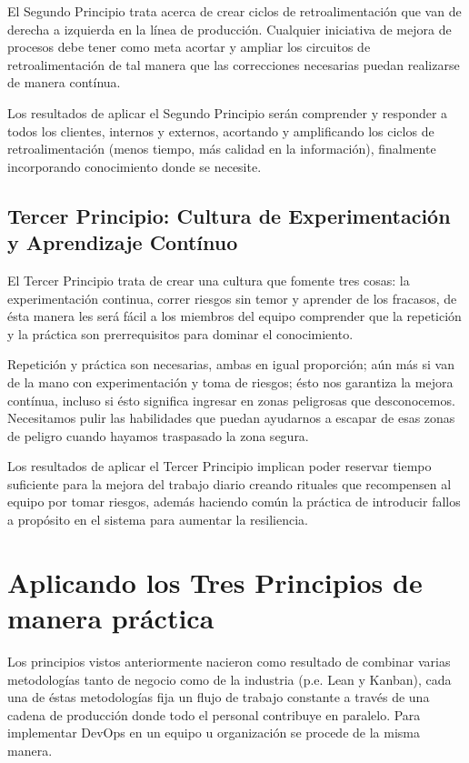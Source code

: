 \documentclass[conference]{IEEEtran}
\begin{document}
El Segundo Principio trata acerca de crear ciclos de retroalimentación que van de derecha a izquierda en la línea de producción. Cualquier iniciativa de mejora de procesos debe tener como meta acortar y ampliar los circuitos de retroalimentación de tal manera que las correcciones necesarias puedan realizarse de manera contínua.

Los resultados de aplicar el Segundo Principio serán comprender y responder a todos los clientes, internos y externos, acortando y amplificando los ciclos de retroalimentación (menos tiempo, más calidad en la información), finalmente incorporando conocimiento donde se necesite.

\subsection{Tercer Principio: Cultura de Experimentación y Aprendizaje Contínuo}

El Tercer Principio trata de crear una cultura que fomente tres cosas: la experimentación continua, correr riesgos sin temor y aprender de los fracasos, de ésta manera les será fácil a los miembros del equipo comprender que la repetición y la práctica son prerrequisitos para dominar el conocimiento.

Repetición y práctica son necesarias, ambas en igual proporción; aún más si van de la mano con experimentación y toma de riesgos; ésto nos garantiza la mejora contínua, incluso si ésto significa ingresar en zonas peligrosas que desconocemos. Necesitamos pulir las habilidades que puedan ayudarnos a escapar de esas zonas de peligro cuando hayamos traspasado la zona segura.

Los resultados de aplicar el Tercer Principio implican poder reservar tiempo suficiente para la mejora del trabajo diario creando rituales que recompensen al equipo por tomar riesgos, además haciendo común la práctica de introducir fallos a propósito en el sistema para aumentar la resiliencia.

\section{Aplicando los Tres Principios de manera práctica}

Los principios vistos anteriormente nacieron como resultado de combinar varias metodologías tanto de negocio como de la industria (p.e. Lean y Kanban), cada una de éstas metodologías fija un flujo de trabajo constante a través de una cadena de producción donde todo el personal contribuye en paralelo. Para implementar DevOps en un equipo u organización se procede de la misma manera. 
\end{document}

